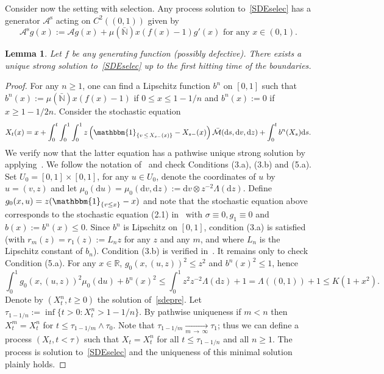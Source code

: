 \documentclass[10pt]{amsart}
\newtheorem{lemm}[theo]{Lemma}\newtheorem{prop}[theo]{Proposition}\newtheorem{coro}[theo]{Corollary}\newtheorem{conj}[theo]{Conjecture}
\theoremstyle{definition}\newtheorem{defi}[theo]{Definition}\newtheorem{rema}[theo]{Remark}\newtheorem{exam}[theo]{Example}\newtheorem{exem}[theo]{Example}\newtheorem{nota}[theo]{Notation}
\newcommand{\ddr}{\mathrm{d}}
\newcommand{\rms}{\mathrm{s}}
\newcommand{\bbmun}{\mathbbm{1}}
\newcommand{\bbN}{\mathbb{N}}
\newcommand{\bbR}{\mathbb{R}}
\newcommand{\clM}{\mathcal{M}}
\newcommand{\clA}{\mathcal{A}}
\begin{document}
Consider now the setting with selection. Any process solution to~\eqref{SDEselec} has a generator $\clA^{\rms}$ acting on $C^{2}((0,1))$ given by
\begin{equation}\label{generatorWFs}
\clA^{\rms}g(x):=\clA g(x)+\mu(\bar{\bbN})x(f(x)-1)g'(x) \text{ for any }x\in (0,1).
\end{equation}

\begin{lemm}\label{minimalprocess}
Let $f$ be any generating function (possibly defective). There exists a unique strong solution to~\eqref{SDEselec} up to the first hitting time of the boundaries.
\end{lemm}
\begin{proof}
For any $n\geq 1$, one can find a Lipschitz function $b^{n}$ on $[0,1]$ such that $b^{n}(x):=\mu(\bar{\bbN})x(f(x)-1)$ if $0\leq x\leq 1-1/n$ and $b^{n}(x):=0$ if $x\geq 1-1/2n$. Consider the stochastic equation
\begin{equation}\label{sdepre}
X_t(x)=x+\int_{0}^{t}\int_{0}^{1}\int_{0}^{1}z\left(\bbmun_{\left\{v\,\leq\,X_{s-}(x)\right\}}-X_{s-}(x)\right)\bar{\clM}(\ddr s,\ddr v, \ddr z)+\int_0^{t}b^{n}(X_s)\ddr s.
\end{equation}
We verify now that the latter equation has a pathwise unique strong solution by applying~\cite[Theorem~5.1]{li2012}. We follow the notation of~\cite{li2012} and check Conditions (3.a), (3.b) and (5.a). Set $U_0=[0,1]\times [0,1]$, for any $u\in U_0$, denote the coordinates of $u$ by $u=(v,z)$ and let $\mu_0(\ddr u)=\mu_0(\ddr v,\ddr z):=\ddr v \otimes z^{-2}\Lambda(\ddr z)$. Define $g_0(x,u)=z(\bbmun_{\{v\leq x\}}-x)$ and note that the stochastic equation above corresponds to the stochastic equation (2.1) in~\cite{li2012} with $\sigma\equiv 0, g_1\equiv 0$ and $b(x):=b^{n}(x)\leq 0$. Since $b^{n}$ is Lipschitz on $[0,1]$, condition (3.a) is satisfied (with $r_m(z)=r_1(z):=L_n z$ for any $z$ and any $m$, and where $L_n$ is the Lipschitz constant of $b_n$). Condition (3.b) is verified in~\cite[Corollary~6.2]{li2012}. It remains only to check Condition (5.a). For any $x\in \bbR$, $g_0(x,(u,z))^2\leq z^2$ and $b^{n}(x)^2\leq 1$, hence
\[
\int_0^1 g_0(x,(u,z))^2 \mu_0(\ddr u)+b^{n}(x)^2\leq \int_0^1 z^{2}z^{-2}\Lambda(\ddr z)+1= \Lambda((0,1))+1\leq K\left(1+x^2\right).
\]
Denote by $(X_t^{n},t\geq 0)$ the solution of~\eqref{sdepre}. Let $\tau_{1-1/n}:=\inf\{t>0: X_t^{n}> 1-1/n\}$. By pathwise uniqueness if $m<n$ then $X_t^{m}=X_t^{n}$ for $t\leq \tau_{1-1/m}\wedge \tau_0$. Note that $\tau_{1-1/m}\underset{m\,\rightarrow\,\infty}{\longrightarrow} \tau_1$; thus we can define a process $(X_t,t<\tau)$ such that $X_t=X_t^{n}$ for all $t\leq \tau_{1-1/n}$ and all $n\geq 1$. The process is solution to~\eqref{SDEselec} and the uniqueness of this minimal solution plainly holds.
\end{proof}
\end{document}
